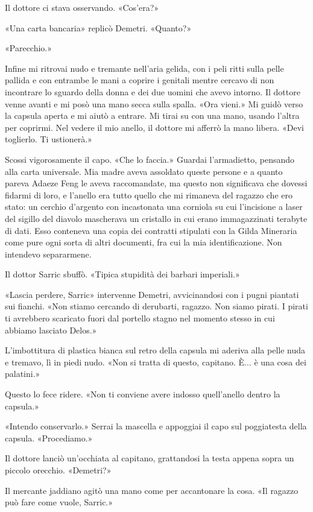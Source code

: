 Il dottore ci stava osservando. «Cos'era?»

«Una carta bancaria» replicò Demetri. «Quanto?»

«Parecchio.»

Infine mi ritrovai nudo e tremante nell'aria gelida, con i peli ritti
sulla pelle pallida e con entrambe le mani a coprire i genitali mentre
cercavo di non incontrare lo sguardo della donna e dei due uomini che
avevo intorno. Il dottore venne avanti e mi posò una mano secca sulla
spalla. «Ora vieni.» Mi guidò verso la capsula aperta e mi aiutò a
entrare. Mi tirai su con una mano, usando l'altra per coprirmi. Nel
vedere il mio anello, il dottore mi afferrò la mano libera. «Devi
toglierlo. Ti ustionerà.»

Scossi vigorosamente il capo. «Che lo faccia.» Guardai l'armadietto,
pensando alla carta universale. Mia madre aveva assoldato queste persone
e a quanto pareva Adaeze Feng le aveva raccomandate, ma questo non
significava che dovessi fidarmi di loro, e l'anello era tutto quello che
mi rimaneva del ragazzo che ero stato: un cerchio d'argento con
incastonata una corniola su cui l'incisione a laser del sigillo del
diavolo mascherava un cristallo in cui erano immagazzinati terabyte di
dati. Esso conteneva una copia dei contratti stipulati con la Gilda
Mineraria come pure ogni sorta di altri documenti, fra cui la mia
identificazione. Non intendevo separarmene.

Il dottor Sarric sbuffò. «Tipica stupidità dei barbari imperiali.»

«Lascia perdere, Sarric» intervenne Demetri, avvicinandosi con i pugni
piantati sui fianchi. «Non stiamo cercando di derubarti, ragazzo. Non
siamo pirati. I pirati ti avrebbero scaricato fuori dal portello stagno
nel momento stesso in cui abbiamo lasciato Delos.»

L'imbottitura di plastica bianca sul retro della capsula mi aderiva alla
pelle nuda e tremavo, lì in piedi nudo. «Non si tratta di questo,
capitano. È... è una cosa dei palatini.»

Questo lo fece ridere. «Non ti conviene avere indosso quell'anello
dentro la capsula.»

«Intendo conservarlo.» Serrai la mascella e appoggiai il capo sul
poggiatesta della capsula. «Procediamo.»

Il dottore lanciò un'occhiata al capitano, grattandosi la testa appena
sopra un piccolo orecchio. «Demetri?»

Il mercante jaddiano agitò una mano come per accantonare la cosa. «Il
ragazzo può fare come vuole, Sarric.»

